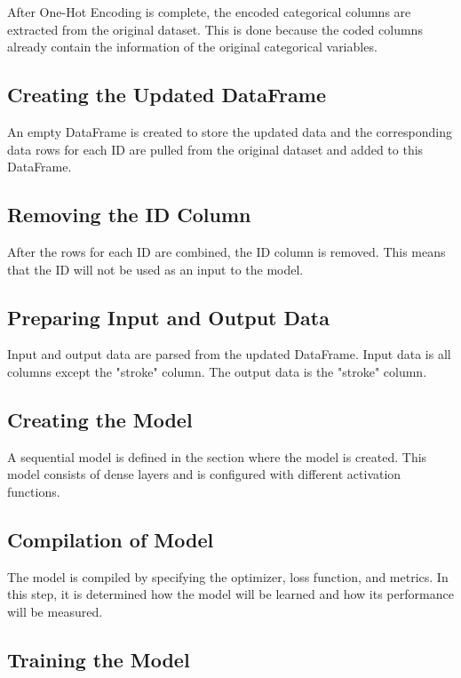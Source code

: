 \documentclass{article}
\begin{document}
\begin{titlepage}
\begin{item}
After One-Hot Encoding is complete, the encoded categorical columns are extracted from the original dataset. This is done because the coded columns already contain the information of the original categorical variables.

\subsection{Creating the Updated DataFrame}

An empty DataFrame is created to store the updated data and the corresponding data rows for each ID are pulled from the original dataset and added to this DataFrame.

\subsection{Removing the ID Column}

After the rows for each ID are combined, the ID column is removed. This means that the ID will not be used as an input to the model.

\subsection{Preparing Input and Output Data}

Input and output data are parsed from the updated DataFrame. Input data is all columns except the "stroke" column. The output data is the "stroke" column.

\subsection{Creating the Model}

A sequential model is defined in the section where the model is created. This model consists of dense layers and is configured with different activation functions.

\subsection{Compilation of Model}

The model is compiled by specifying the optimizer, loss function, and metrics. In this step, it is determined how the model will be learned and how its performance will be measured.

\subsection{Training the Model}


\end{item}
\end{titlepage}
\end{document}
